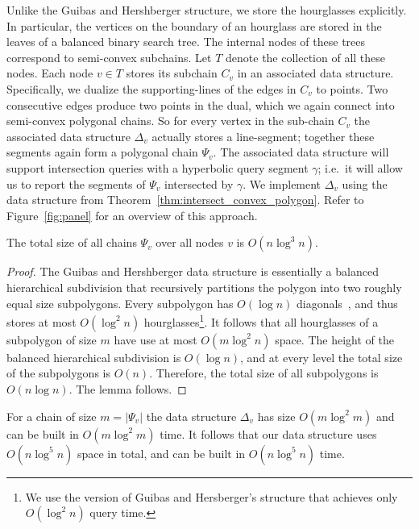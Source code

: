 \documentclass[UKenglish]{lipics-v2019}
\begin{document}
Unlike the Guibas and Hershberger structure, we store the hourglasses
explicitly. In particular, the vertices on the boundary of an hourglass are
stored in the leaves of a balanced binary search tree. The internal nodes of
these trees correspond to semi-convex subchains. Let $T$ denote the collection
of all these nodes. Each node $v \in T$ stores its subchain $C_v$ in an
associated data structure. Specifically, we dualize the supporting-lines of the
edges in $C_v$ to points. Two consecutive edges produce two points in the dual, which we
again connect into semi-convex polygonal chains. 
So for every vertex in the sub-chain $C_v$ the associated data
structure $\Delta_v$ actually stores a line-segment; together these segments
again form a polygonal chain $\Psi_v$. The associated data structure will
support intersection queries with a hyperbolic query segment $\gamma$;
i.e.~it will allow us to report the segments of $\Psi_v$ intersected by
$\gamma$. We implement $\Delta_v$ using the data structure from
Theorem~\ref{thm:intersect_convex_polygon}. Refer to Figure~\ref{fig:panel} for an overview of this approach.

\begin{lemma}
  \label{lem:space_dual_chains}
  The total size of all chains $\Psi_v$ over all nodes $v$ is $O(n\log^3 n)$.
\end{lemma}

\begin{proof}
  The Guibas and Hershberger data structure is essentially a balanced
  hierarchical subdivision that recursively partitions the polygon into two
  roughly equal size subpolygons. Every subpolygon has $O(\log n)$
  diagonals~\cite{guibas1989optimal}, and thus stores at most $O(\log^2 n)$
  hourglasses\footnote{We use the version of Guibas and Hersberger's structure
    that achieves only $O(\log^2 n)$ query time.}. It follows that all
  hourglasses of a subpolygon of size $m$ have use at most $O(m\log^2 n)$
  space. The height of the balanced hierarchical subdivision is $O(\log n)$,
  and at every level the total size of the subpolygons is $O(n)$. Therefore,
  the total size of all subpolygons is $O(n\log n)$. The lemma follows.
\end{proof}

For a chain of size $m=|\Psi_v|$ the data structure $\Delta_v$ has size
$O(m\log^2 m)$ and can be built in $O(m\log^2 m)$ time. It follows that our
data structure uses $O(n\log^5 n)$ space in total, and can be built in
$O(n\log^5 n)$ time.
\end{document}
